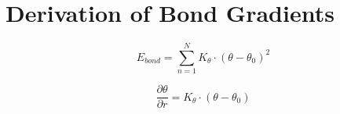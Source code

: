 \section{Derivation of Bond Gradients}
\[E_{bond}=\sum_{n=1}^{N}K_{\theta}\cdot(\theta-\theta_{0})^2\]

\[\frac{\partial \theta}{\partial r}=K_{\theta}\cdot(\theta-\theta_{0})\]
